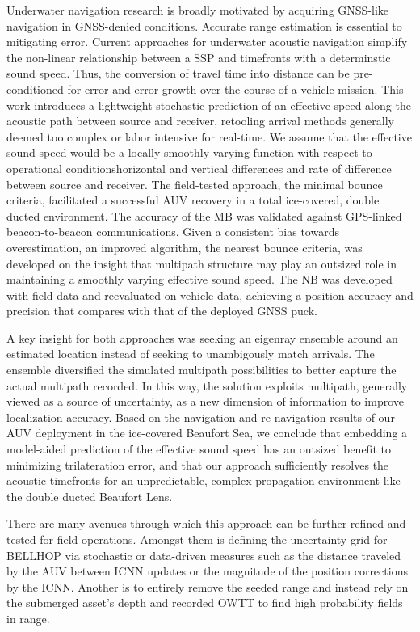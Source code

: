Underwater navigation research is broadly motivated by acquiring GNSS-like navigation in GNSS-denied conditions.
Accurate range estimation is essential to mitigating error.
Current approaches for underwater acoustic navigation simplify the non-linear relationship between a SSP and timefronts with a determinstic sound speed.
Thus, the conversion of travel time into distance can be pre-conditioned for error and error growth over the course of a vehicle mission.
This work introduces a lightweight stochastic prediction of an effective speed along the acoustic path between source and receiver, retooling arrival methods generally deemed too complex or labor intensive for real-time.
We assume that the effective sound speed would be a locally smoothly varying function with respect to operational conditions\textemdash horizontal and vertical differences and rate of difference between source and receiver.
The field-tested approach, the minimal bounce criteria, facilitated a successful AUV recovery in a total ice-covered, double ducted environment.
The accuracy of the MB was validated against GPS-linked beacon-to-beacon communications.
Given a consistent bias towards overestimation, an improved algorithm, the nearest bounce criteria, was developed on the insight that multipath structure may play an outsized role in maintaining a smoothly varying effective sound speed.
The NB was developed with field data and reevaluated on vehicle data, achieving a position accuracy and precision that compares with that of the deployed GNSS puck.

A key insight for both approaches was seeking an eigenray ensemble around an estimated location instead of seeking to unambigously match arrivals.
The ensemble diversified the simulated multipath possibilities to better capture the actual multipath recorded.
In this way, the solution exploits multipath, generally viewed as a source of uncertainty, as a new dimension of information to improve localization accuracy.
Based on the navigation and re-navigation results of our AUV deployment in the ice-covered Beaufort Sea, we conclude that embedding a model-aided prediction of the effective sound speed has an outsized benefit to minimizing trilateration error, and that our approach sufficiently resolves the acoustic timefronts for an unpredictable, complex propagation environment like the double ducted Beaufort Lens.

There are many avenues through which this approach can be further refined and tested for field operations.
Amongst them is defining the uncertainty grid for BELLHOP via stochastic or data-driven measures such as the distance traveled by the AUV between ICNN updates or the magnitude of the position corrections by the ICNN.
Another is to entirely remove the seeded range and instead rely on the submerged asset's depth and recorded OWTT to find high probability fields in range.

